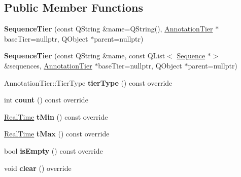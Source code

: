 \subsection*{Public Member Functions}
\begin{DoxyCompactItemize}
\item 
\mbox{\label{class_sequence_tier_a99b112042467f75ee0e72d38c0596143}} 
{\bfseries Sequence\+Tier} (const Q\+String \&name=Q\+String(), \hyperlink{class_annotation_tier}{Annotation\+Tier} $\ast$base\+Tier=nullptr, Q\+Object $\ast$parent=nullptr)
\item 
\mbox{\label{class_sequence_tier_af30e9512ac556573e6bb9dd84dfaedda}} 
{\bfseries Sequence\+Tier} (const Q\+String \&name, const Q\+List$<$ \hyperlink{class_sequence}{Sequence} $\ast$$>$ \&sequences, \hyperlink{class_annotation_tier}{Annotation\+Tier} $\ast$base\+Tier=nullptr, Q\+Object $\ast$parent=nullptr)
\item 
\mbox{\label{class_sequence_tier_abbdfdb337ebff4aa24d9986155032935}} 
Annotation\+Tier\+::\+Tier\+Type {\bfseries tier\+Type} () const override
\item 
\mbox{\label{class_sequence_tier_a3c153f45f40becc562facf1f87984ba7}} 
int {\bfseries count} () const override
\item 
\mbox{\label{class_sequence_tier_a27639b67ee0f8909dfe983b5a553fbf2}} 
\hyperlink{struct_real_time}{Real\+Time} {\bfseries t\+Min} () const override
\item 
\mbox{\label{class_sequence_tier_a3b0d0094e865c6949f3191f85400bf6c}} 
\hyperlink{struct_real_time}{Real\+Time} {\bfseries t\+Max} () const override
\item 
\mbox{\label{class_sequence_tier_a01f2c97474b854bbed05deeb6d060cad}} 
bool {\bfseries is\+Empty} () const override
\item 
\mbox{\label{class_sequence_tier_ab6b298de3358fac29d3298866c1d5fe8}} 
void {\bfseries clear} () override
\item 
\mbox{\label{class_sequence_tier_a1c4097d05ad26043b8e5424bf0108a3c}} 
$$
\end{DoxyCompactItemize}
